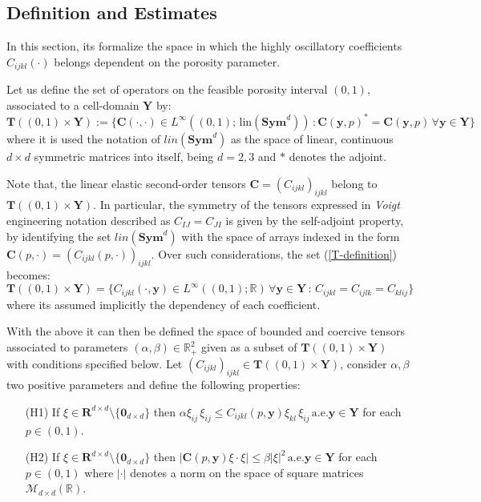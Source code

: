 \subsection{Definition and Estimates}
In this section, its formalize the space in which the highly oscillatory coefficients $C_{ijkl}(\cdot)$ belongs dependent on the porosity parameter.
\begin{defn}
Let us define the set of operators on the feasible porosity interval $(0,1)$, associated to a cell-domain $\mathbf{Y}$ by:
\begin{equation}
    \label{T-definition}
    \mathbf{T}((0,1) \times \mathbf{Y}) := \big \{ \mathbf{C}(\cdot, \cdot) \in L^{\infty}((0,1); \, \text{lin}(\textbf{Sym}^d))\, : \mathbf{C}(\mathbf{y}, p)^* = \mathbf{C}(\mathbf{y}, p) \, \forall \mathbf{y} \in \mathbf{Y}\big \}
\end{equation}
where it is used the notation of $lin(\mathbf{Sym}^d)$ as the space of linear, continuous $d\times d$ symmetric matrices into itself, being $d=2,3$ and $*$ denotes the adjoint. 
\end{defn}
\begin{rem}
Note that, the linear elastic second-order tensors $\mathbf{C} = (C_{ijkl})_{ijkl}$ belong to $\mathbf{T}((0,1)\times \mathbf{Y})$. In particular, the symmetry of the tensors expressed in \textit{Voigt} engineering notation described as $C_{IJ}=C_{JI}$ is given by the self-adjoint property, by identifying the set $lin(\mathbf{Sym}^d)$ with the space of arrays indexed in the form $\mathbf{C}(p, \cdot) = (C_{ijkl} (p, \cdot) )_{ijkl}$.
Over such considerations, the set (\ref{T-definition}) becomes:
\begin{equation*}
    \mathbf{T}((0,1)\times \mathbf{Y}) = \big \{ C_{ijkl}(\cdot, \mathbf{y}) \in L^{\infty}((0,1); \mathbb{R})  \, \forall \mathbf{y} \in \mathbf{Y}\,:\, C_{ijkl} = C_{ijlk} = C_{klij} \big \}
\end{equation*}
where its assumed implicitly the dependency of each coefficient.
\end{rem}
With the above it can then be defined the space of bounded and coercive tensors associated to parameters $(\alpha,\beta) \in \mathbb{R}^2_+$ given as a subset of $\mathbf{T}((0,1)\times \mathbf{Y})$ with conditions specified below.
Let $(C_{ijkl})_{ijkl} \in \mathbf{T}((0,1)\times \mathbf{Y})$, consider $\alpha, \beta$ two positive parameters and define the following properties:
\begin{enumerate}
    \item[(H1)] If $\xi \in \mathbf{R}^{d\times d} \setminus \{\mathbf{0}_{d \times d}\}$ then $\alpha \xi_{ij} \, \xi_{ij} \leq C_{ijkl}(p,\mathbf{y})  \xi_{kl}\,\xi_{ij}\, \text{a.e.} \mathbf{y} \in \mathbf{Y}$ for each $p \in (0,1)$.
    \item[(H2)] If $\xi \in \mathbf{R}^{d\times d} \setminus \{\mathbf{0}_{d \times d}\}$ then $\vert \mathbf{C}(p,\mathbf{y}) \xi\cdot \xi \vert \leq \beta \vert \xi \vert^2 \, \text{a.e.}\mathbf{y} \in \mathbf{Y}$ for each $p \in (0,1)$ where $\vert \cdot \vert$ denotes a norm on the space of square matrices $\mathcal{M}_{d\times d}(\mathbb{R})$.
\end{enumerate}
